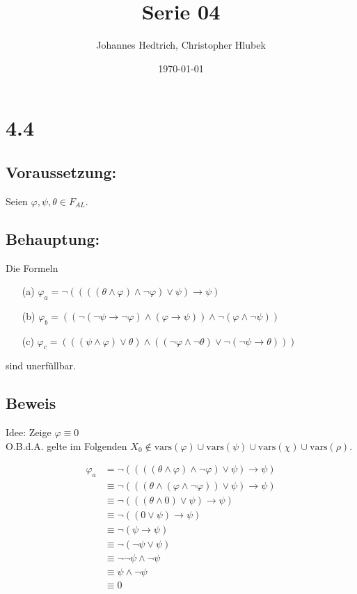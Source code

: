 \documentclass[12pt,a4paper]{scrartcl}
\title{Serie 04}
\author{Johannes Hedtrich, Christopher Hlubek}
\date{\today}
\begin{document}
\section*{4.4}
\subsection*{Voraussetzung:}

Seien $\varphi, \psi, \theta \in F_{AL}$.

\subsection*{Behauptung:}
Die Formeln
\begin{enumerate}
  \item[(a)] $\varphi_a = \neg((((\theta \wedge \varphi) \wedge \neg \varphi) \vee \psi) \rightarrow \psi)$
  \item[(b)] $\varphi_b = ((\neg (\neg \psi \rightarrow \neg \varphi) \wedge (\varphi \rightarrow \psi)) \wedge \neg(\varphi \wedge \neg \psi))$
  \item[(c)] $\varphi_c = (((\psi \wedge \varphi) \vee \theta) \wedge ((\neg \varphi \wedge \neg \theta) \vee \neg(\neg \psi \rightarrow \theta)))$
\end{enumerate}
sind unerfüllbar.

\subsection*{Beweis}

Idee: Zeige $\varphi \equiv 0$\\
O.B.d.A. gelte im Folgenden $X_0 \not\in \textrm{vars}(\varphi) \cup \textrm{vars}(\psi) \cup \textrm{vars}(\chi) \cup \textrm{vars}(\rho)$.

\setcounter{equation}{-1}
\begin{align}
  \varphi_a
    & =\neg ((((\theta \wedge \varphi) \wedge \neg \varphi) \vee \psi) \rightarrow \psi) \\
    & \equiv \neg(((\theta \wedge (\varphi \wedge \neg \varphi)) \vee \psi) \rightarrow \psi) \\
    & \equiv \neg(((\theta \wedge 0) \vee \psi) \rightarrow \psi) \\
    & \equiv \neg((0 \vee \psi) \rightarrow \psi) \\
    & \equiv \neg(\psi \rightarrow \psi) \\
    & \equiv \neg(\neg \psi \vee \psi) \\
    & \equiv \neg \neg \psi \wedge \neg \psi \\
    & \equiv \psi \wedge \neg \psi \\
    & \equiv 0
\end{align}
\end{document}

